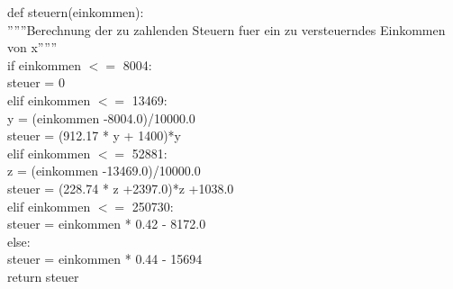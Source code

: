 \begin{MyConsoleBox}{
def steuern(einkommen):\\
\hspace{0.5cm}    ''''''Berechnung der zu zahlenden Steuern fuer ein zu versteuerndes Einkommen von x'''''' \\
\hspace{0.5cm}    if einkommen $<=$ 8004: \\
\hspace{1.0cm}         steuer = 0 \\
\hspace{0.5cm}    elif einkommen $<=$ 13469: \\
\hspace{1.0cm}         y = (einkommen -8004.0)/10000.0 \\
\hspace{1.0cm}         steuer = (912.17 * y + 1400)*y \\
\hspace{0.5cm}    elif einkommen $<=$ 52881: \\
\hspace{1.0cm}         z = (einkommen -13469.0)/10000.0 \\
\hspace{1.0cm}         steuer = (228.74 * z +2397.0)*z +1038.0 \\
\hspace{0.5cm}    elif einkommen $<=$ 250730: \\
\hspace{1.0cm}         steuer = einkommen * 0.42 - 8172.0 \\
\hspace{0.5cm}    else: \\
\hspace{1.0cm}        steuer = einkommen * 0.44 - 15694 \\
\hspace{0.5cm}    return steuer \\
}\end{MyConsoleBox}

